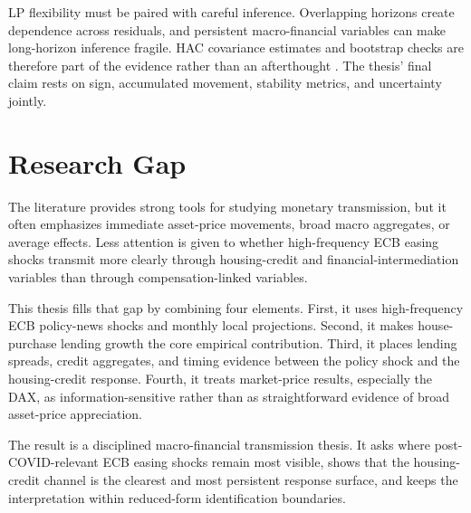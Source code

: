 LP flexibility must be paired with careful inference. Overlapping horizons create dependence across residuals, and persistent macro-financial variables can make long-horizon inference fragile. HAC covariance estimates and bootstrap checks are therefore part of the evidence rather than an afterthought \parencite{NeweyWest1987}. The thesis' final claim rests on sign, accumulated movement, stability metrics, and uncertainty jointly.

\section{Research Gap}

The literature provides strong tools for studying monetary transmission, but it often emphasizes immediate asset-price movements, broad macro aggregates, or average effects. Less attention is given to whether high-frequency ECB easing shocks transmit more clearly through housing-credit and financial-intermediation variables than through compensation-linked variables.

This thesis fills that gap by combining four elements. First, it uses high-frequency ECB policy-news shocks and monthly local projections. Second, it makes house-purchase lending growth the core empirical contribution. Third, it places lending spreads, credit aggregates, and timing evidence between the policy shock and the housing-credit response. Fourth, it treats market-price results, especially the DAX, as information-sensitive rather than as straightforward evidence of broad asset-price appreciation.

The result is a disciplined macro-financial transmission thesis. It asks where post-COVID-relevant ECB easing shocks remain most visible, shows that the housing-credit channel is the clearest and most persistent response surface, and keeps the interpretation within reduced-form identification boundaries.
